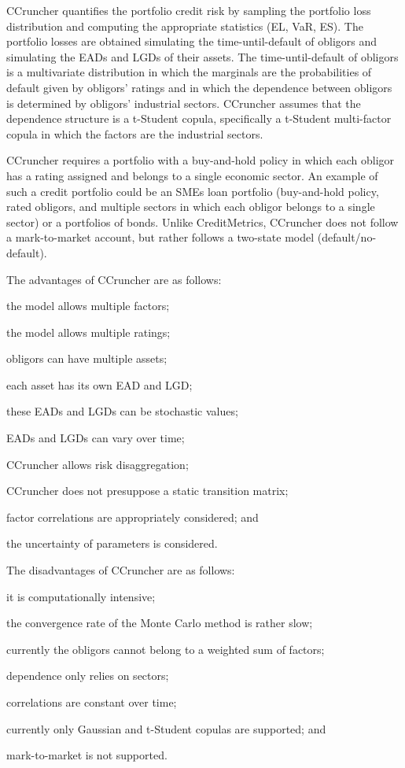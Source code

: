 \documentclass[11pt,fleqn]{book} %
\begin{document}
CCruncher quantifies the portfolio credit risk by sampling the portfolio loss
distribution and computing the appropriate statistics (EL, VaR, ES). The 
portfolio losses are obtained simulating the time-until-default of obligors 
and simulating the EADs and LGDs of their assets. The time-until-default of 
obligors is a multivariate distribution in which the marginals are the 
probabilities of default given by obligors' ratings and in which the dependence 
between obligors is determined by obligors' industrial sectors. CCruncher 
assumes that the dependence structure is a t-Student copula, specifically 
a t-Student multi-factor copula in which the factors are the industrial sectors.

CCruncher requires a portfolio with a buy-and-hold policy in which each obligor 
has a rating assigned and belongs to a single economic sector. An example of 
such a credit portfolio could be an SMEs loan portfolio (buy-and-hold policy, 
rated obligors, and multiple sectors in which each obligor belongs to a single 
sector) or a portfolios of bonds. Unlike CreditMetrics\texttrademark{}, CCruncher 
does not follow a mark-to-market account, but rather follows a two-state model 
(default/no-default). 

The advantages of CCruncher are as follows: 
\begin{inparaenum}[1)]
	\item the model allows multiple factors;
	\item the model allows multiple ratings;
	\item obligors can have multiple assets;
	\item each asset has its own EAD and LGD;
	\item these EADs and LGDs can be stochastic values;
	\item EADs and LGDs can vary over time; 
	\item CCruncher allows risk disaggregation;
	\item CCruncher does not presuppose a static transition matrix;
	\item factor correlations are appropriately considered; and
	\item the uncertainty of parameters is considered.
\end{inparaenum}

The disadvantages of CCruncher are as follows: 
\begin{inparaenum}[1)]
	\item it is computationally intensive;
	\item the convergence rate of the Monte Carlo method is rather slow;
	\item currently the obligors cannot belong to a weighted sum of factors;
	\item dependence only relies on sectors;
	\item correlations are constant over time;
	\item currently only Gaussian and t-Student copulas are supported; and
	\item mark-to-market is not supported.
\end{inparaenum}
\end{document}
